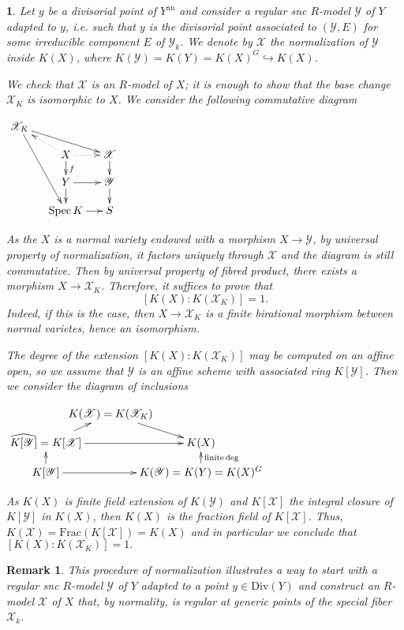 \documentclass{amsart}%
\numberwithin{equation}{subsection}
\theoremstyle{plain2}
\theoremstyle{definition2}
\newtheorem{rem}[equation]{Remark}
\theoremstyle{stepstyle}
\theoremstyle{point}
\theoremstyle{subpoint}
\newtheorem{subpoint}[equation]{}%
\newcommand{\spa}[1]{\begin{subpoint}#1\end{subpoint}}           %
\newcommand{\cX}{\ensuremath{\mathscr{X}}}
\newcommand{\cY}{\ensuremath{\mathscr{Y}}}
\renewcommand{\cY}{\ensuremath{\mathscr{Y}}}
\newcommand{\Spec}{\ensuremath{\mathrm{Spec}\,}}
\newcommand{\an}{\mathrm{an}}
\begin{document}
\spa{Let $y$ be a divisorial point of $Y^\an$ and consider a regular snc $R$-model $\cY$ of $Y$ adapted to $y$, i.e. such that $y$ is the divisorial point associated to $(\cY, E)$ for some irreducible component $E$ of $\cY_k$. We denote by $\cX$ the normalization of $\cY$ inside $K(X) $, where $K(\cY)=K(Y)=K(X)^{G} \hookrightarrow K(X)$.

We check that $\cX$ is an $R$-model of $X$; it is enough to show that the base change $\cX_K$ is isomorphic to $X$. We consider the following commutative diagram
\begin{center}$
\begin{gathered}
\xymatrixrowsep{1pc}
\xymatrixcolsep{1pc}\xymatrix{ 
\cX_K \ar[drr] \ar[dddr] & & \\
& X \ar@{.>}[r] \ar@{.>}[ul]\ar[d]^{f} & \cX \ar[d] \\
& Y \ar[r] \ar[d] & \cY  \ar[d]\\
& \Spec K \ar[r] & S \\
}
\end{gathered}$
\end{center} As the $X$ is a normal variety endowed with a morphism $X \rightarrow \cY$, by universal property of normalization, it factors uniquely through $\cX$ and the diagram is still commutative. Then by universal property of fibred product, there exists a morphism $X \rightarrow \cX_K$. Therefore, it suffices to prove that $$[K(X):K(\cX_K)]=1.$$ Indeed, if this is the case, then $X \rightarrow \cX_K$ is a finite birational morphism between normal varietes, hence an isomorphism.

The degree of the extension $[K(X):K(\cX_K)]$ may be computed on an affine open, so we assume that $\cY$ is an affine scheme with associated ring $K[\cY]$. Then we consider the diagram of inclusions
\begin{center} 
$ \xymatrixcolsep{-1.5pc} \xymatrixrowsep{0.7pc}\xymatrix{ 
& K(\cX)=K(\cX_K) \ar[dr] & \\
\widehat{K[\cY]}=K[\cX] \ar[rr] \ar[ru] & & K(X)\\
K[\cY] \ar[u] \ar[rr]& & K(\cY)=K(Y)=K(X)^{G} \ar[u]_{\text{finite} \deg} \\
}$
\end{center} As $K(X)$ is finite field extension of $K(\cY)$ and $K[\cX]$ the integral closure of $K[\cY]$ in $K(X)$, then $K(X)$ is the fraction field of $K[\cX]$. Thus, $K(\cX) = \text{Frac}(K[\cX])=K(X)$ and in particular we conclude that $[K(X):K(\cX_K)]=1.$
}
\begin{rem} \label{rem divisorial repre quotient}
This procedure of normalization illustrates a way to start with a regular snc $R$-model $\cY$ of $Y$ adapted to a point $y \in \text{Div}(Y)$ and construct an $R$-model $\cX$ of $X$ that, by normality, is regular at generic points of the special fiber $\cX_k$. 
\end{rem}
\end{document}
